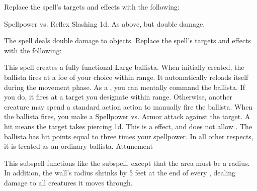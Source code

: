 Replace the spell's targets and effects with the following:
\begin{spellcontent}
\begin{augmenttargetinginfo}
\end{augmenttargetinginfo}
\begin{augmenteffects}
\begin{spellattack}{Spellpower vs. Reflex}
\spellsuccess Slashing  \minus1d.
\spellcritical As above, but double damage.
\end{spellattack}
\end{augmenteffects}
\end{spellcontent}
The spell deals double damage to objects.
Replace the spell's targets and effects with the following:
\begin{spellcontent}
\begin{augmenttargetinginfo}
\end{augmenttargetinginfo}
\begin{augmenteffects}
\spelleffect
This spell creates a fully functional Large ballista.
When initially created, the ballista fires at a foe of your choice within \rnglong range.
It automatically reloads itself during the movement phase.
As a , you can mentally command the ballista.
If you do, it fires at a target you designate within \rnglong range.
Otherwise, another creature may spend a standard action action to manually fire the ballista.
When the ballista fires, you make a Spellpower vs. Armor attack against the target.
A hit means the target takes piercing  \minus1d.
This is a  effect, and does not allow .
The ballista has hit points equal to three times your spellpower.
In all other respects, it is treated as an ordinary ballista.
\spelldur Attunement
\end{augmenteffects}
\end{spellcontent}
This subspell functions like the  subspell, except that the area must be a radius.
In addition, the wall's radius shrinks by 5 feet at the end of every , dealing damage to all creatures it moves through.
